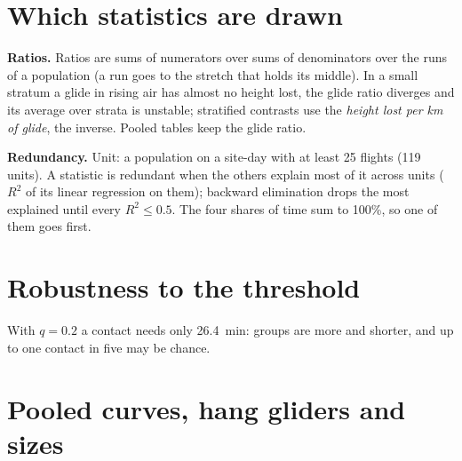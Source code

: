 \section{Which statistics are drawn}\label{app:redundancy}

\textbf{Ratios.} Ratios are sums of numerators over sums of denominators over the runs of a population (a run
goes to the stretch that holds its middle). In a small stratum a glide in rising air has almost no height lost, the glide ratio
diverges and its average over strata is unstable; stratified contrasts use the \emph{height lost per km of glide}, the inverse. Pooled tables keep the glide ratio.

\textbf{Redundancy.} Unit: a population on a site-day with at least 25 flights (119 units). A statistic is redundant when the others explain most of it across units ($R^2$ of its linear
regression on them); backward elimination drops the most explained until every $R^2\le0.5$. The four shares of time sum to 100\%, so one of them goes first.

\begin{table}[H]
\centering\footnotesize

\caption{Five statistics remain; the others are explained by them.}
\end{table}

\section{Robustness to the threshold}\label{app:robustness}

With $q=0.2$ a contact needs only 26.4~min: groups are more and shorter, and up to one contact in five may be chance.

\begin{table}[H]
\centering\footnotesize

\caption{The main results with the two thresholds (s-d-h: same site-day and hour). Every result at 1000~s and every
phase statistic keeps its sign; at 100~s the estimates turn slightly negative, consistent with no effect within one phase.}
\end{table}

\section{Pooled curves, hang gliders and sizes}\label{app:curves}

